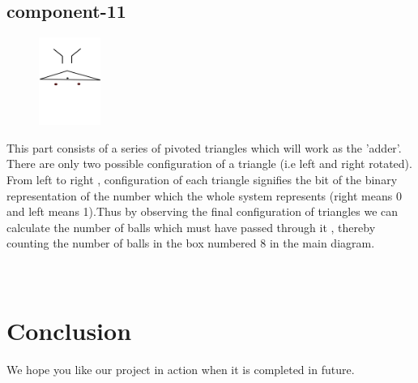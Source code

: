 \documentclass{article}
\begin{document}
\subsection{component-11}
\begin{figure}
    \centering
    \vspace{-20pt}
    \includegraphics[width=0.18\textwidth]{p11}
    \vspace{-20pt}
\end{figure}
This part consists of a series of pivoted triangles which will work as the 'adder'. There are only two possible configuration of a triangle (i.e left and right rotated). From left to right , configuration of each triangle signifies the bit of the binary representation of the number which the whole system represents (right means 0 and left means 1).Thus by observing the final configuration of triangles we can calculate the number of balls which must have passed through it , thereby counting the number of balls in the box numbered 8 in the main diagram.
\\
\\
\\

\newpage

\section{Conclusion}
We hope you like our project in action when it is completed in future.
\\
\\
\\



\end{document}
